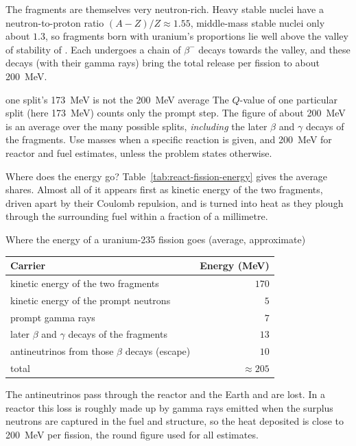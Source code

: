 The fragments are themselves very neutron-rich. Heavy stable nuclei have a neutron-to-proton ratio
$(A-Z)/Z\approx1.55$, middle-mass stable nuclei only about $1.3$, so fragments born with uranium's
proportions lie well above the valley of stability of . Each undergoes a chain of
$\beta^-$ decays towards the valley, and these decays (with their gamma rays) bring the total release per
fission to about \SI{200}{\MeV}.

\begin{trapbox}{one split's \SI{173}{\MeV} is not the \SI{200}{\MeV} average}
The $Q$-value of one particular split (here \SI{173}{\MeV}) counts only the prompt step. The figure of
about \SI{200}{\MeV} is an average over the many possible splits, \emph{including} the later $\beta$ and
$\gamma$ decays of the fragments. Use masses when a specific reaction is given, and \SI{200}{\MeV} for
reactor and fuel estimates, unless the problem states otherwise.
\end{trapbox}

Where does the energy go? Table~\ref{tab:react-fission-energy} gives the average shares. Almost all of it appears
first as kinetic energy of the two fragments, driven apart by their Coulomb repulsion, and is turned into
heat as they plough through the surrounding fuel within a fraction of a millimetre.

\begin{tablebox}{Where the energy of a uranium-235 fission goes (average, approximate)}
\centering
\begin{tabular}{@{}lr@{}}\toprule
Carrier & Energy (MeV)\\\midrule
kinetic energy of the two fragments & $170$\\
kinetic energy of the prompt neutrons & $5$\\
prompt gamma rays & $7$\\
later $\beta$ and $\gamma$ decays of the fragments & $13$\\
antineutrinos from those $\beta$ decays (escape) & $10$\\\midrule
total & $\approx205$\\\bottomrule
\end{tabular}\label{tab:react-fission-energy}
\par\raggedright
The antineutrinos pass through the reactor and the Earth and are lost. In a reactor this loss is roughly
made up by gamma rays emitted when the surplus neutrons are captured in the fuel and structure, so the heat
deposited is close to \SI{200}{\MeV} per fission, the round figure used for all estimates.
\end{tablebox}

